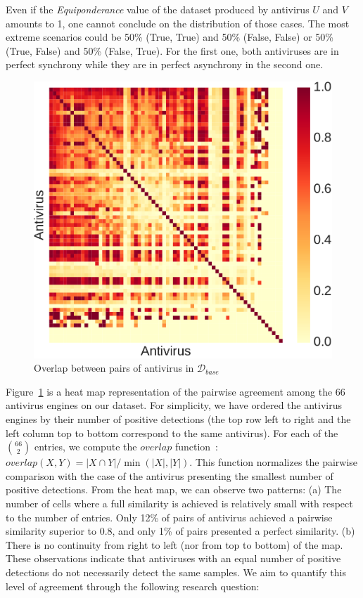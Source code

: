 Even if the \emph{Equiponderance} value of the dataset produced by antivirus $U$ and $V$ amounts to 1, one cannot conclude on the distribution of those cases.
The most extreme scenarios could be 50\% (True, True) and 50\% (False, False) or 50\% (True, False) and 50\% (False, True).
For the first one, both antiviruses are in perfect synchrony while they are in perfect asynchrony in the second one.

\begin{figure}[!ht]
	\centering
	\includegraphics[width=0.75\linewidth]{figures/stase/synchronicity.pdf}
        \caption[Overlap between pairs of antivirus]{Overlap between pairs of antivirus in $\mathcal{D}_{base}$}
	\label{figure:stase:synchronicity}
\end{figure}

Figure~\ref{figure:stase:synchronicity} is a heat map representation of the pairwise agreement among the 66 antivirus engines on our dataset.
For simplicity, we have ordered the antivirus engines by their number of positive detections (the top row left to right and the left column top to bottom correspond to the same antivirus).
For each of the $\binom{66}{2}$ entries, we compute the $overlap$ function~\cite{pfitzner_characterization_2009}: $overlap(X,Y) = |X \cap Y| / \min(|X|, |Y|)$.
This function normalizes the pairwise comparison with the case of the antivirus presenting the smallest number of positive detections.
From the heat map, we can observe two patterns: (a) The number of cells where a full similarity is achieved is relatively small with respect to the number of entries.
Only 12\% of pairs of antivirus achieved a pairwise similarity superior to 0.8, and only 1\% of pairs presented a perfect similarity.
(b) There is no continuity from right to left (nor from top to bottom) of the map.
These observations indicate that antiviruses with an equal number of positive detections do not necessarily detect the same samples.
We aim to quantify this level of agreement through the following research question:

